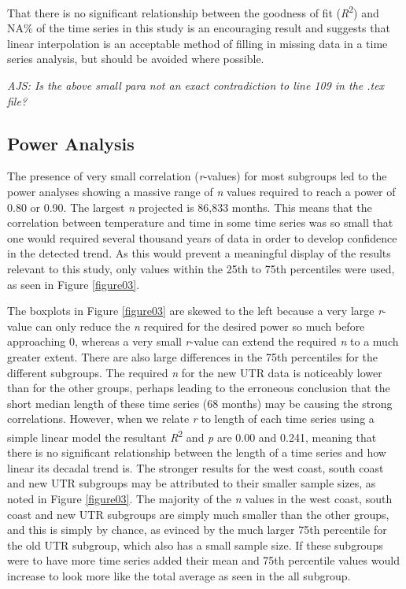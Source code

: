 \documentclass{ametsoc}
\begin{document}
That there is no significant relationship between the goodness of fit (\emph{R}\textsuperscript{2}) and NA\% of the time series in this study is an encouraging result and suggests that linear interpolation is an acceptable method of filling in missing data in a time series analysis, but should be avoided where possible.

\emph{AJS: Is the above small para not an exact contradiction to line 109 in the .tex file?}

\subsection{Power Analysis}
The presence of very small correlation (\emph{r}-values) for most subgroups led to the power analyses showing a massive range of \emph{n} values required to reach a power of 0.80 or 0.90. The largest \emph{n} projected is 86,833 months. This means that the correlation between temperature and time in some time series was so small that one would required several thousand years of data in order to develop confidence in the detected trend. As this would prevent a meaningful display of the results relevant to this study, only values within the 25th to 75th percentiles were used, as seen in Figure \ref{figure03}.

The boxplots in Figure \ref{figure03} are skewed to the left because a very large \emph{r}-value can only reduce the \emph{n} required for the desired power so much before approaching 0, whereas a very small \emph{r}-value can extend the required \emph{n} to a much greater extent. There are also large differences in the 75th percentiles for the different subgroups. The required \emph{n} for the new UTR data is noticeably lower than for the other groups, perhaps leading to the erroneous conclusion that the short median length of these time series (68 months) may be causing the strong correlations. However, when we relate \emph{r} to length of each time series using a simple linear model the resultant \emph{R}\textsuperscript{2} and \emph{p} are 0.00 and 0.241, meaning that there is no significant relationship between the length of a time series and how linear its decadal trend is. The stronger results for the west coast, south coast and new UTR subgroups may be attributed to their smaller sample sizes, as noted in Figure \ref{figure03}. The majority of the \emph{n} values in the west coast, south coast and new UTR subgroups are simply much smaller than the other groups, and this is simply by chance, as evinced by the much larger 75th percentile for the old UTR subgroup, which also has a small sample size. If these subgroups were to have more time series added their mean and 75th percentile values would increase to look more like the total average as seen in the all subgroup.
\end{document}
